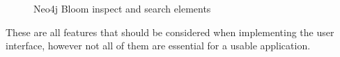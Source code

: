 \begin{figure}[H]%
    \centering
    \qquad
    \caption{Neo4j Bloom inspect and search elements}\label{bloomImg}
\end{figure}
These are all features that should be considered when implementing the user interface, however not all of them are essential for a usable application.